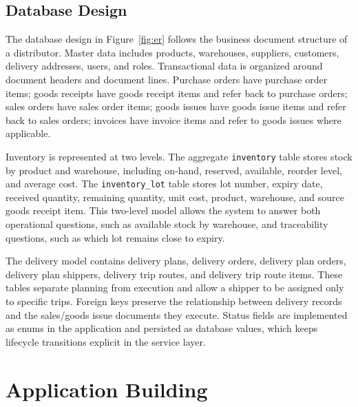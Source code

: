 \subsection{Database Design}
The database design in Figure~\ref{fig:er} follows the business document
structure of a distributor. Master data includes products, warehouses,
suppliers, customers, delivery addresses, users, and roles. Transactional data
is organized around document headers and document lines. Purchase orders have
purchase order items; goods receipts have goods receipt items and refer back to
purchase orders; sales orders have sales order items; goods issues have goods
issue items and refer back to sales orders; invoices have invoice items and
refer to goods issues where applicable.

Inventory is represented at two levels. The aggregate \texttt{inventory} table
stores stock by product and warehouse, including on-hand, reserved, available,
reorder level, and average cost. The \texttt{inventory\_lot} table stores lot
number, expiry date, received quantity, remaining quantity, unit cost, product,
warehouse, and source goods receipt item. This two-level model allows the system
to answer both operational questions, such as available stock by warehouse, and
traceability questions, such as which lot remains close to expiry.

The delivery model contains delivery plans, delivery orders, delivery plan
orders, delivery plan shippers, delivery trip routes, and delivery trip route
items. These tables separate planning from execution and allow a shipper to be
assigned only to specific trips. Foreign keys preserve the relationship between
delivery records and the sales/goods issue documents they execute. Status fields
are implemented as enums in the application and persisted as database values,
which keeps lifecycle transitions explicit in the service layer.

\section{Application Building}


